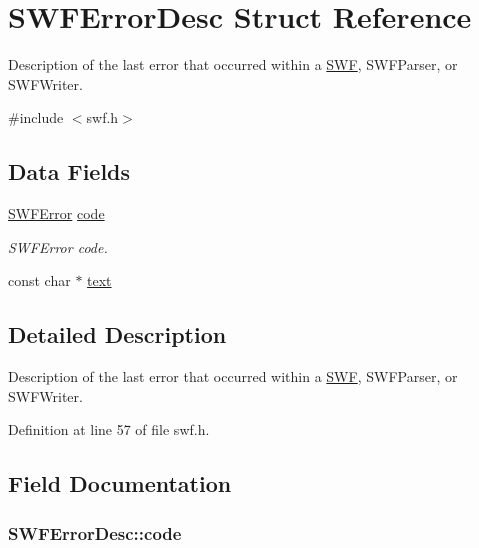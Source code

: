 \hypertarget{struct_s_w_f_error_desc}{\section{S\-W\-F\-Error\-Desc Struct Reference}
\label{struct_s_w_f_error_desc}
}


Description of the last error that occurred within a \hyperlink{struct_s_w_f}{S\-W\-F}, S\-W\-F\-Parser, or S\-W\-F\-Writer.  




{\ttfamily \#include $<$swf.\-h$>$}

\subsection*{Data Fields}
\begin{DoxyCompactItemize}
\item 
\hyperlink{swf_8h_ac5e09b34f3a970beec42aa757ffb3e99}{S\-W\-F\-Error} \hyperlink{struct_s_w_f_error_desc_a015c657c922b53342ee1aa321be29084}{code}
\begin{DoxyCompactList}\small\item\em S\-W\-F\-Error code. \end{DoxyCompactList}\item 
const char $\ast$ \hyperlink{struct_s_w_f_error_desc_ae8e679264f1fce07de9795638f760ca0}{text}
\end{DoxyCompactItemize}


\subsection{Detailed Description}
Description of the last error that occurred within a \hyperlink{struct_s_w_f}{S\-W\-F}, S\-W\-F\-Parser, or S\-W\-F\-Writer. 

Definition at line 57 of file swf.\-h.



\subsection{Field Documentation}
\hypertarget{struct_s_w_f_error_desc_a015c657c922b53342ee1aa321be29084}{
\subsubsection[{code}]{ S\-W\-F\-Error\-Desc\-::code}}\label{struct_s_w_f_error_desc_a015c657c922b53342ee1aa321be29084}


